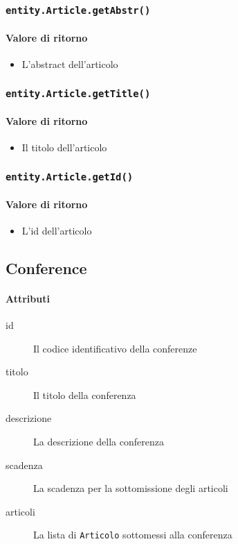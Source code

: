 \subsubsection{\texttt{entity.Article.getAbstr()}}
\paragraph{Valore di ritorno}
\begin{itemize}
\item L'abstract dell'articolo
\end{itemize}

\subsubsection{\texttt{entity.Article.getTitle()}}
\paragraph{Valore di ritorno}
\begin{itemize}
\item Il titolo dell'articolo
\end{itemize}

\subsubsection{\texttt{entity.Article.getId()}}
\paragraph{Valore di ritorno}
\begin{itemize}
\item L'id dell'articolo
\end{itemize}

\subsection{Conference}
\paragraph{Attributi}
\begin{description}
\item[id] Il codice identificativo della conferenze
\item[titolo] Il titolo della conferenza
\item[descrizione] La descrizione della conferenza
\item[scadenza] La scadenza per la sottomissione degli articoli
\item[articoli] La lista di \texttt{Articolo} sottomessi alla conferenza
\end{description}

